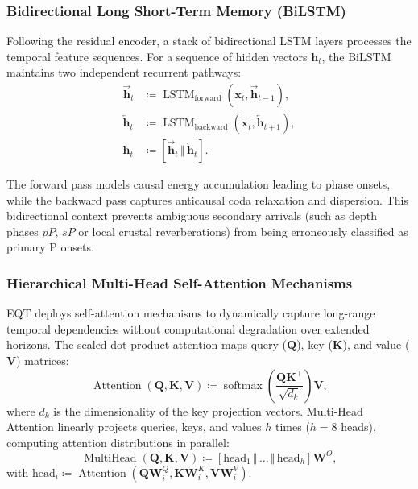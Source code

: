 \subsubsection{Bidirectional Long Short-Term Memory (BiLSTM)}
Following the residual encoder, a stack of bidirectional \ac{LSTM}
layers processes the temporal feature sequences. For a sequence of
hidden vectors $\mathbf{h}_t$, the
BiLSTM maintains two independent recurrent pathways:
\begin{align}
  \overrightarrow{\mathbf{h}}_t & \coloneqq
  \operatorname{LSTM}_{\mathrm{forward}}\left( \mathbf{x}_t,
  \overrightarrow{\mathbf{h}}_{t - 1} \right), \\
  \overleftarrow{\mathbf{h}}_t & \coloneqq
  \operatorname{LSTM}_{\mathrm{backward}}\left( \mathbf{x}_t,
  \overleftarrow{\mathbf{h}}_{t + 1} \right), \\
  \mathbf{h}_t & \coloneqq \left[ \overrightarrow{\mathbf{h}}_t \, \Big\Vert
  \, \overleftarrow{\mathbf{h}}_t \right].
\end{align}

The forward pass models causal energy accumulation leading to phase
onsets, while the backward pass captures anticausal coda relaxation
and dispersion. This bidirectional context prevents ambiguous
secondary arrivals (such as depth phases $pP$, $sP$ or local crustal
reverberations) from being erroneously classified as primary P onsets.

\subsubsection{Hierarchical Multi-Head Self-Attention Mechanisms}
\ac{EQT} deploys self-attention mechanisms to dynamically
capture long-range temporal dependencies without computational
degradation over extended horizons. The scaled dot-product attention
maps query ($\mathbf{Q}$), key ($\mathbf{K}$), and value
($\mathbf{V}$) matrices:
\begin{equation}
  \operatorname{Attention}(\mathbf{Q}, \mathbf{K}, \mathbf{V}) \coloneqq
  \operatorname{softmax}\left( \frac{\mathbf{Q}\mathbf{K}^\top}{\sqrt{d_k}}
  \right) \mathbf{V},
  \label{eq:attention_mechanism}
\end{equation}
where $d_k$ is the dimensionality of the key projection vectors.
Multi-Head Attention linearly projects queries, keys, and values $h$
times ($h = 8$ heads), computing attention distributions in parallel:
\begin{equation}
  \operatorname{MultiHead}(\mathbf{Q}, \mathbf{K}, \mathbf{V}) \coloneqq \left[
    \mathrm{head}_1 \, \Vert \, \dots \, \Vert \, \mathrm{head}_h
  \right] \mathbf{W}^O,
\end{equation}
with $\mathrm{head}_i \coloneqq
\operatorname{Attention}(\mathbf{Q}\mathbf{W}_i^Q,
\mathbf{K}\mathbf{W}_i^K, \mathbf{V}\mathbf{W}_i^V)$.

